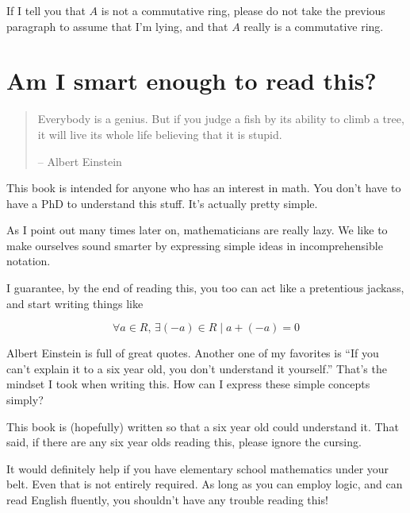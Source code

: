 If I tell you that $A$ is not a commutative ring, please do not take the
previous paragraph to assume that I'm lying, and that $A$ really is a
commutative ring.
\section{Am I smart enough to read this?}

\begin{quotation}
  Everybody is a genius. But if you judge a fish by its ability to climb a tree,
  it will live its whole life believing that it is stupid.
  
  -- Albert Einstein
\end{quotation}

This book is intended for anyone who has an interest in math. You don't have to
have a PhD to understand this stuff. It's actually pretty simple.

As I point out many times later on, mathematicians are really lazy. We like to
make ourselves sound smarter by expressing simple ideas in incomprehensible
notation.

I guarantee, by the end of reading this, you too can act like a pretentious
jackass, and start writing things like

$$\forall a \in R,\, \exists (-a) \in R \mid a + (-a) = 0$$

Albert Einstein is full of great quotes. Another one of my favorites is ``If you
can't explain it to a six year old, you don't understand it yourself.'' That's
the mindset I took when writing this. How can I express these simple concepts
simply?

This book is (hopefully) written so that a six year old could understand
it. That said, if there are any six year olds reading this, please ignore the
cursing.

It would definitely help if you have elementary school mathematics under your
belt. Even that is not entirely required. As long as you can employ logic, and
can read English fluently, you shouldn't have any trouble reading this!
